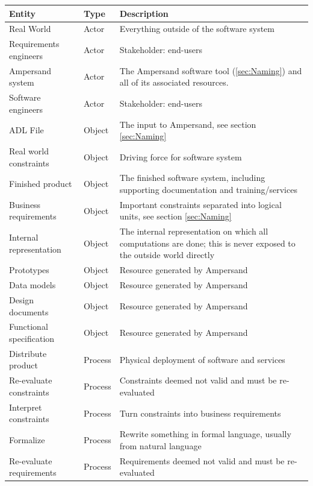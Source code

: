 \documentclass[12pt]{report}
\begin{document}
\begin{longtable}{ |m{4.5cm}|m{1.5cm}|m{7cm}|  }
\hline 
\textbf{Entity} & \textbf{Type} & \textbf{Description} \\
\hline \hline
Real World & Actor & Everything outside of the software system \\ \hline
Requirements engineers & Actor & Stakeholder: end-users\\ \hline 
Ampersand system & Actor & The Ampersand software tool (\ref{sec:Naming}) and
  all of its associated resources. \\ \hline 
Software engineers & Actor & Stakeholder: end-users\\ \hline
ADL File        & Object        & The input to Ampersand, see section 
\ref{sec:Naming} \\ \hline  
Real world constraints  & Object & Driving force for software system \\
Finished product  & Object & The finished software system, including supporting 
documentation and training/services  \\ \hline
Business requirements & Object & Important constraints separated
into logical units, see section \ref{sec:Naming} \\ \hline
Internal representation & Object & The internal representation on which all
  computations are done; this is never exposed to the outside world directly \\ 
  \hline
Prototypes & Object & Resource generated by Ampersand \\ \hline
Data models & Object & Resource generated by Ampersand \\ \hline
Design documents & Object & Resource generated by Ampersand \\ \hline
Functional specification & Object & Resource generated by Ampersand \\ 
\hline
Distribute product & Process & Physical deployment of software and services \\ 
\hline
Re-evaluate
constraints & Process & Constraints deemed not valid and must be 
re-evaluated \\ \hline
Interpret constraints & Process & Turn constraints into business requirements 
\\ \hline
Formalize & Process & Rewrite something in formal language, usually from 
natural language \\ \hline
Re-evaluate
requirements & Process & Requirements deemed not valid and must be re-evaluated
\\ \hline

\end{longtable}
\end{document}

